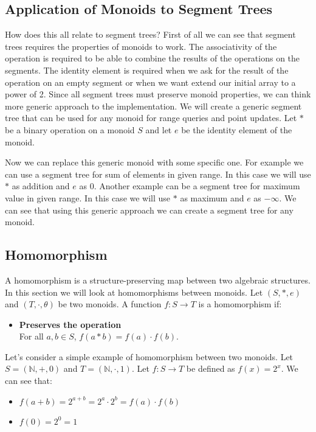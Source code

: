 \documentclass{article}
\begin{document}
\subsection{Application of Monoids to Segment Trees}
How does this all relate to segment trees?
First of all we can see that segment trees requires the properties of monoids to work.
The associativity of the operation is required to be able to combine the results of the operations on the segments.
The identity element is required when we ask for the result of the operation on an empty segment or 
when we want extend our initial array to a power of 2. 
Since all segment trees must preserve monoid properties, we can think more generic 
approach to the implementation. We will create a generic segment tree that can be used for any monoid for 
range queries and point updates. Let \(\ast\) be a binary operation on a monoid \(S\) and let \(e\) be the identity element of the monoid.


\FloatBarrier
Now we can replace this generic monoid with some specific one.
For example we can use a segment tree for sum of elements in given range.
In this case we will use \(\ast\) as addition and \(e\) as 0. 
Another example can be a segment tree for maximum value in given range.
In this case we will use \(\ast\) as maximum and \(e\) as \(-\infty\).
We can see that using this generic approach we can create a segment tree for any monoid.

\subsection{Homomorphism}
A homomorphism is a structure-preserving map between two algebraic structures.
In this section we will look at homomorphisms between monoids.
Let \( (S, \ast, e) \) and \( (T, \cdot, \theta) \) be two monoids.
A function \( f: S \to T \) is a homomorphism if:
\begin{itemize}
    \item \textbf{Preserves the operation} \\
    For all \( a, b \in S \), \( f(a \ast b) = f(a) \cdot f(b) \).
\end{itemize}
Let's consider a simple example of homomorphism between two monoids.
Let \( S = (\mathbb{N}, +, 0) \) and \( T = (\mathbb{N}, \cdot, 1) \).
Let \( f: S \to T \) be defined as \( f(x) = 2^x \).
We can see that:
\begin{itemize}
    \item \( f(a + b) = 2^{a + b} = 2^a \cdot 2^b = f(a) \cdot f(b) \)
    \item \( f(0) = 2^0 = 1 \)
\end{itemize}
\end{document}
